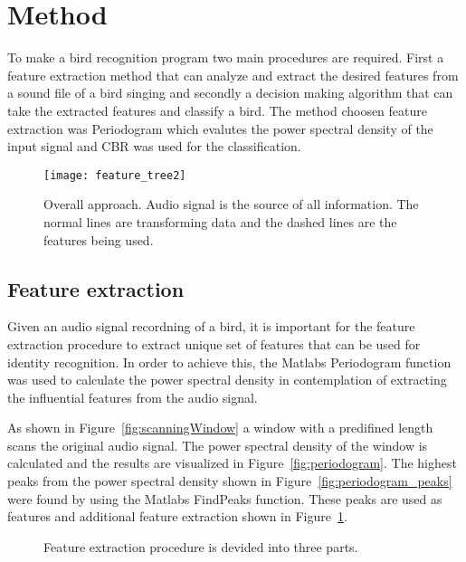 \section{Method}
To make a bird recognition program two main procedures are required. First a feature
extraction method that can analyze and extract the desired features from a
sound file of a bird singing and secondly a decision making algorithm that can
take the extracted features and classify a bird. The method choosen feature
extraction was Periodogram which evalutes the power spectral density of the
input signal and CBR was used for the classification.

\begin{figure}[h]
\centering
\texttt{[image: feature\_tree2]}
\caption{Overall approach. Audio signal is the source of all information. The normal lines are transforming data and the dashed lines are the features being used.}
\label{fig:approach}
\end{figure}

\subsection{Feature extraction}
Given an audio signal recordning of a bird, it is important for the feature extraction
procedure to extract unique set of features that can be used for identity recognition.
In order to achieve this, the Matlabs Periodogram function was used to calculate the power
spectral density in contemplation of extracting the influential features from the audio signal.

As shown in Figure~\ref{fig:scanningWindow} a window with a predifined
length scans the original audio signal. The power spectral density of the window
is calculated and the results are visualized in Figure~\ref{fig:periodogram}.
The highest peaks from the power spectral density shown in Figure~\ref{fig:periodogram_peaks} were found
by using the Matlabs FindPeaks function. These peaks are used as features and additional feature extraction shown in Figure~\ref{fig:approach}.


\begin{figure}[htp]




    \caption{Feature extraction procedure is devided into three parts.}
    \label{fig:featureExtraction}
\end{figure}




